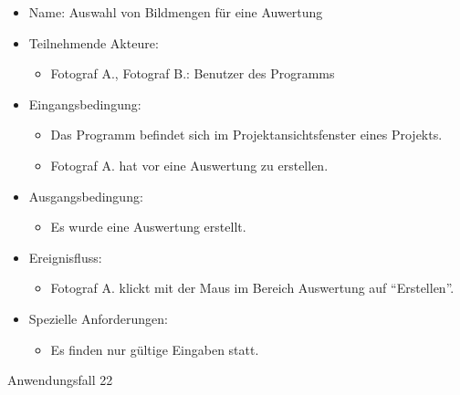 	\begin{itemize}
		\item Name: Auswahl von Bildmengen für eine Auwertung
		\item Teilnehmende Akteure:
		\begin{itemize}
			\item	Fotograf A., Fotograf B.: Benutzer des Programms		
		\end{itemize}
		\item Eingangsbedingung:
		\begin{itemize}
			\item	Das Programm befindet sich im Projektansichtsfenster eines Projekts.
			\item Fotograf A. hat vor eine Auswertung zu erstellen.
		\end{itemize}
		\item Ausgangsbedingung:
		\begin{itemize}
			\item	Es wurde eine Auswertung erstellt.	
		\end{itemize}
		\item Ereignisfluss:
		\begin{itemize}
			\item Fotograf A. klickt mit der Maus im Bereich Auswertung auf "`Erstellen"'.
		\end{itemize}
		\item Spezielle Anforderungen:
		\begin{itemize}
			\item	Es finden nur gültige Eingaben statt.			
		\end{itemize}			
	\end{itemize}
	
	\begin{description}
		\item[Anwendungsfall 22]
	\end{description}
	
